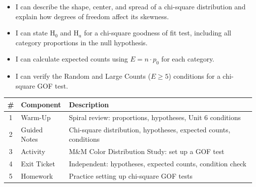 \documentclass[10pt]{article}
\begin{document}

\vspace{2.4cm}
\namedateperiod

\begin{learningtargetbox}
\begin{itemize}
    \item I can describe the shape, center, and spread of a chi-square distribution
          and explain how degrees of freedom affect its skewness.
    \item I can state H$_0$ and H$_a$ for a chi-square goodness of fit test, including
          all category proportions in the null hypothesis.
    \item I can calculate expected counts using $E = n \cdot p_0$ for each category.
    \item I can verify the Random and Large Counts ($E \ge 5$) conditions for a
          chi-square GOF test.
\end{itemize}
\end{learningtargetbox}

\begin{tocbox}
\renewcommand{\arraystretch}{1.5}
\begin{tabularx}{\linewidth}{clX}
    \textbf{\#} & \textbf{Component} & \textbf{Description} \\
    \hline
    1 & Warm-Up      & Spiral review: proportions, hypotheses, Unit 6 conditions \\
    2 & Guided Notes & Chi-square distribution, hypotheses, expected counts, conditions \\
    3 & Activity     & M\&M Color Distribution Study: set up a GOF test \\
    4 & Exit Ticket  & Independent: hypotheses, expected counts, condition check \\
    5 & Homework     & Practice setting up chi-square GOF tests \\
\end{tabularx}
\end{tocbox}
\end{document}

